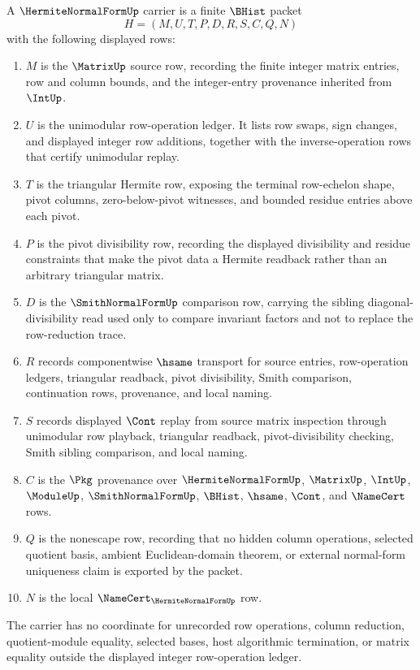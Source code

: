 \begin{definition}
\label{def:hermite-normal-form-carrier}
A $\HermiteNormalFormUp$ carrier is a finite $\BHist$ packet
$$
H=(M,U,T,P,D,R,S,C,Q,N)
$$
with the following displayed rows:
\begin{enumerate}
\item $M$ is the $\MatrixUp$ source row, recording the finite integer matrix entries, row and column bounds, and the integer-entry provenance inherited from $\IntUp$.
\item $U$ is the unimodular row-operation ledger. It lists row swaps, sign changes, and displayed integer row additions, together with the inverse-operation rows that certify unimodular replay.
\item $T$ is the triangular Hermite row, exposing the terminal row-echelon shape, pivot columns, zero-below-pivot witnesses, and bounded residue entries above each pivot.
\item $P$ is the pivot divisibility row, recording the displayed divisibility and residue constraints that make the pivot data a Hermite readback rather than an arbitrary triangular matrix.
\item $D$ is the $\SmithNormalFormUp$ comparison row, carrying the sibling diagonal-divisibility read used only to compare invariant factors and not to replace the row-reduction trace.
\item $R$ records componentwise $\hsame$ transport for source entries, row-operation ledgers, triangular readback, pivot divisibility, Smith comparison, continuation rows, provenance, and local naming.
\item $S$ records displayed $\Cont$ replay from source matrix inspection through unimodular row playback, triangular readback, pivot-divisibility checking, Smith sibling comparison, and local naming.
\item $C$ is the $\Pkg$ provenance over $\HermiteNormalFormUp$, $\MatrixUp$, $\IntUp$, $\ModuleUp$, $\SmithNormalFormUp$, $\BHist$, $\hsame$, $\Cont$, and $\NameCert$ rows.
\item $Q$ is the nonescape row, recording that no hidden column operations, selected quotient basis, ambient Euclidean-domain theorem, or external normal-form uniqueness claim is exported by the packet.
\item $N$ is the local $\NameCert_{\HermiteNormalFormUp}$ row.
\end{enumerate}
The carrier has no coordinate for unrecorded row operations, column reduction, quotient-module equality, selected bases, host algorithmic termination, or matrix equality outside the displayed integer row-operation ledger.
\end{definition}


